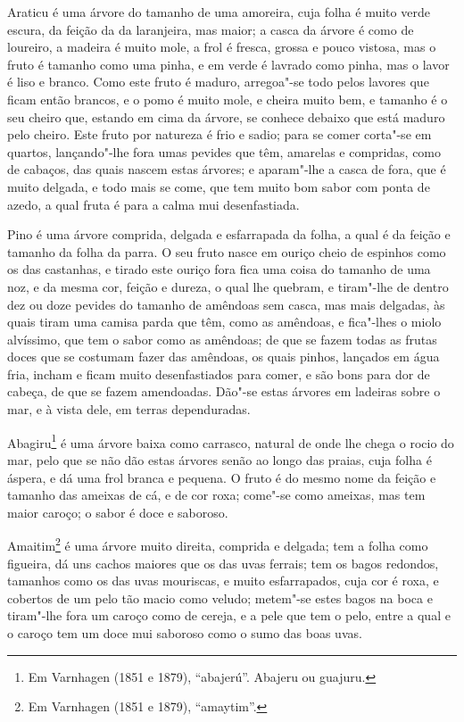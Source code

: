 Araticu é uma árvore do tamanho de uma amoreira, cuja folha é muito verde escura, da
feição da da laranjeira, mas maior; a casca da árvore é como de loureiro, a madeira é
muito mole, a frol é fresca, grossa e pouco vistosa, mas o fruto é tamanho como uma pinha,
e em verde é lavrado como pinha, mas o lavor é liso e branco. Como este fruto é maduro,
arregoa"-se todo pelos lavores que ficam então brancos, e o pomo é muito mole, e cheira
muito bem, e tamanho é o seu cheiro que, estando em cima da árvore, se conhece debaixo que
está maduro pelo cheiro. Este fruto por natureza é frio e sadio; para se comer corta"-se em
quartos, lançando"-lhe fora umas pevides que têm, amarelas e compridas, como de cabaços,
das quais nascem estas árvores; e aparam"-lhe a casca de fora, que é muito delgada, e todo
mais se come, que tem muito bom sabor com ponta de azedo, a qual fruta é para a calma mui
desenfastiada.

Pino é uma árvore comprida, delgada e esfarrapada da folha, a qual é da feição e tamanho
da folha da parra. O seu fruto nasce em ouriço cheio de espinhos como os das castanhas, e
tirado este ouriço fora fica uma coisa do tamanho de uma noz, e da mesma cor, feição e
dureza, o qual lhe quebram, e tiram"-lhe de dentro dez ou doze pevides do tamanho de
amêndoas sem casca, mas mais delgadas, às quais tiram uma camisa parda que têm, como as
amêndoas, e fica"-lhes o miolo alvíssimo, que tem o sabor como as amêndoas; de que se fazem
todas as frutas doces que se costumam fazer das amêndoas, os quais pinhos, lançados em
água fria, incham e ficam muito desenfastiados para comer, e são bons para dor de cabeça,
de que se fazem amendoadas. Dão"-se estas árvores em ladeiras sobre o mar, e à vista dele,
em terras dependuradas.

Abagiru\footnote{ Em Varnhagen (1851 e 1879), ``abajerú''. Abajeru ou guajuru.} é uma
árvore baixa como carrasco, natural de onde lhe chega o rocio do mar, pelo que se não dão
estas árvores senão ao longo das praias, cuja folha é áspera, e dá uma frol branca e
pequena. O fruto é do mesmo nome da feição e tamanho das ameixas de cá, e de cor roxa;
come"-se como ameixas, mas tem maior caroço; o sabor é doce e saboroso.

Amaitim\footnote{ Em Varnhagen (1851 e 1879), ``amaytim''.} é uma árvore muito direita,
comprida e delgada; tem a folha como figueira, dá uns cachos maiores que os das uvas
ferrais; tem os bagos redondos, tamanhos como os das uvas mouriscas, e muito esfarrapados,
cuja cor é roxa, e cobertos de um pelo tão macio como veludo; metem"-se estes bagos na boca
e tiram"-lhe fora um caroço como de cereja, e a pele que tem o pelo, entre a qual e o
caroço tem um doce mui saboroso como o sumo das boas uvas.

